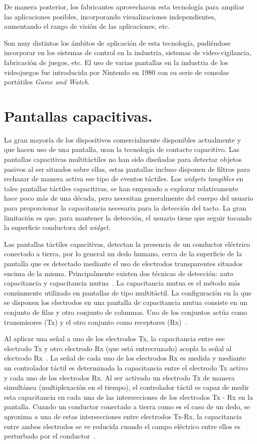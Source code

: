De manera posterior, los fabricantes aprovecharon esta tecnología para ampliar las aplicaciones posibles, incorporando visualizaciones independientes, aumentando el rango de visión de las aplicaciones, etc.

Son muy distintos los ámbitos de aplicación de esta tecnología, pudiéndose incorporar en los sistemas de control en la industria, sistemas de video-vigilancia, fabricación de juegos, etc.
El uso de varias pantallas en la industria de los videojuegos fue introducida por Nintendo en 1980 con su serie de consolas portátiles \emph{Game and Watch}.


\section{Pantallas capacitivas.}
La gran mayoría de los dispositivos comercialmente disponibles actualmente y que hacen uso de una pantalla, usan la tecnología de contacto capacitivo.
Las pantallas capacitivas multitáctiles no han sido diseñadas para detectar objetos pasivos al ser situados sobre ellas, estas pantallas incluso disponen de filtros para rechazar de manera activa ese tipo de eventos táctiles.
Los \emph{widgets tangibles} en tales pantallas táctiles capacitivas, se han empezado a explorar relativamente hace poco más de una década\cite{Rekimoto}, pero necesitan generalmente del cuerpo del usuario para proporcionar la capacitancia necesaria para la detección del tacto. La gran limitación es que, para mantener la detección, el usuario tiene que seguir tocando la superficie conductora del \emph{widget}.

Las pantallas táctiles capacitivas, detectan la presencia de un conductor eléctrico conectado a tierra, por lo general un dedo humano, cerca de la superficie de la pantalla que es detectado mediante el uso de electrodos transparentes situados encima de la misma.
Principalmente existen dos técnicas de detección: auto capacitancia y capacitancia mutua~\cite{Barrett}. La capacitancia mutua es el método más comúnmente utilizado en pantallas de tipo multitáctil.
La configuración en la que se disponen los electrodos en una pantalla de capacitancia mutua consiste en un conjunto de filas y otro conjunto de columnas. Uno de los conjuntos actúa como transmisores (Tx) y el otro conjunto como receptores (Rx)~\cite{Rekimoto}.

Al aplicar una señal a uno de los electrodos Tx, la capacitancia entre ese electrodo Tx y otro electrodo Rx (que está entrecruzado) acopla la señal al electrodo Rx~\cite{Silicon}. La señal de cada uno de los electrodos Rx es medida y mediante un controlador táctil es determinada la capacitancia entre el electrodo Tx activo y cada uno de los electrodos Rx. Al ser activado un electrodo Tx de manera simultánea (multiplexación en el tiempo), el controlador táctil es capaz de medir esta capacitancia en cada una de las intersecciones de los electrodos Tx - Rx en la pantalla.
Cuando un conductor conectado a tierra como es el caso de un dedo, se aproxima a una de estas intersecciones entre electrodos Tx-Rx, la capacitancia entre ambos electrodos se ve reducida cuando el campo eléctrico entre ellos es perturbado por el conductor~\cite{Zimmerman}.

